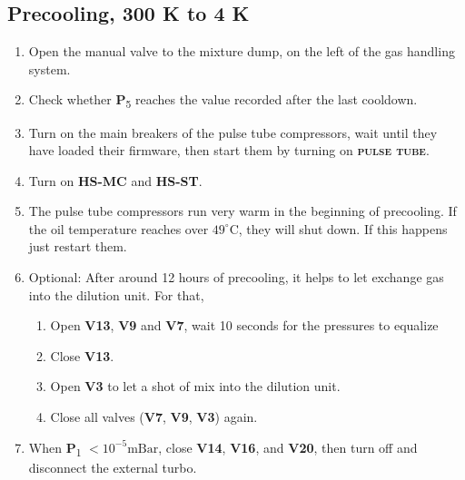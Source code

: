 \documentclass{article}[18pt,A4]
\newcommand{\mBar}{\mathrm{mBar}}
\newcommand{\thing}[1]{{\color{gray}\textsc{ \textbf{#1}}}}
\newcommand{\valve}[1]{{\color{gray}\textbf{V#1}}}
\newcommand{\pressure}[1]{{\color{pressurecolor}\textbf{P}\textsubscript{#1}}}
\begin{document}
\newpage
\subsection{Precooling, 300 K to 4 K}
\begin{enumerate}
    \item Open the manual valve to the mixture dump, on the left of the gas handling system. 
    \item Check whether \pressure{5} reaches the value recorded after the last cooldown.
    \item Turn on the main breakers of the pulse tube compressors, wait until they have loaded their firmware, then start them by turning on \thing{pulse tube}.
    \item Turn on \thing{HS-MC} and \thing{HS-ST}.
    \item The pulse tube compressors run very warm in the beginning of precooling.
    If the oil temperature reaches over $49^\circ\mathrm{C}$, they will shut down. If this happens just restart them. 
    \item Optional: After around 12 hours of precooling, it helps to let exchange gas into the dilution unit. For that, 
        \begin{enumerate}
        \item Open \valve{13}, \valve{9} and \valve{7}, wait 10 seconds for the pressures to equalize
        \item Close \valve{13}. 
        \item Open \valve{3} to let a shot of mix into the dilution unit.
        \item Close all valves (\valve{7}, \valve{9}, \valve{3}) again.
        \end{enumerate}
    \item When \pressure{1} $< 10^{-5} \mBar$, close \valve{14}, \valve{16}, and \valve{20}, then turn off and
disconnect the external turbo.
\end{enumerate}
\end{document}
